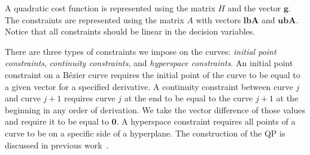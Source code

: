 \documentclass{svproc}
\newcommand{\vg}{\mathbf{g}}
\newcommand{\vzero}{\mathbf{0}}
\newcommand{\vn}{\mathbf{n}}
\newcommand{\vlbA}{\mathbf{lbA}}
\newcommand{\vubA}{\mathbf{ubA}}
\begin{document}
A quadratic cost function is represented using the matrix $H$ and the vector $\vg$. The constraints are represented using the matrix $A$ with vectors $\vlbA$ and $\vubA$.
Notice that all constraints should be linear in the decision variables.

There are three types of constraints we impose on the curves: \emph{initial point constraints}, \emph{continuity constraints}, and \emph{hyperspace constraints}.
An initial point constraint on a B\'ezier curve requires the initial point of the curve to be equal to a given vector for a specified derivative.
A continuity constraint between curve $j$ and curve $j+1$ requires curve $j$ at the end to be equal to the curve $j+1$ at the beginning in any order of derivation.
We take the vector difference of those values and require it to be equal to $\vzero$.
A hyperspace constraint requires all points of a curve to be on a specific side of a hyperplane.
The construction of the QP is discussed in previous work~\cite{crazyplanning-ieeetro}.





\end{document}
